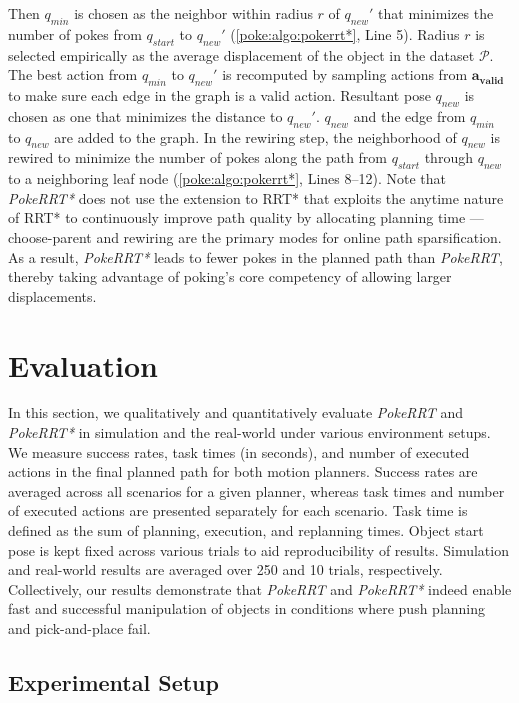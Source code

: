 Then $q_{min}$ is chosen as the neighbor within radius $r$ of $q_{new}'$ that minimizes the number of pokes from $q_{start}$ to $q_{new}'$ (\cref{poke:algo:pokerrt*}, Line 5). Radius $r$ is selected empirically as the average displacement of the object in the dataset $\mathcal{P}$.
The best action from $q_{min}$ to $q_{new}'$ is recomputed by sampling actions from $\boldsymbol{a_{valid}}$ to make sure each edge in the graph is a valid action. Resultant pose $q_{new}$ is chosen as one that minimizes the distance to $q_{new}'$. $q_{new}$ and the edge from $q_{min}$ to $q_{new}$ are added to the graph.
In the rewiring step, the neighborhood of $q_{new}$ is rewired to minimize the number of pokes along the path from $q_{start}$ through $q_{new}$ to a neighboring leaf node (\cref{poke:algo:pokerrt*}, Lines 8--12). Note that \textsl{PokeRRT*} does not use the extension to RRT* that exploits the anytime nature of RRT* to continuously improve path quality by allocating planning time \cite{karaman2011anytime}---choose-parent and rewiring are the primary modes for online path sparsification.
As a result, \textsl{PokeRRT*} leads to fewer pokes in the planned path than \textsl{PokeRRT}, thereby taking advantage of poking's core competency of allowing larger displacements.

\section{Evaluation}
\label{sec:poking:results}

In this section, we qualitatively and quantitatively evaluate \textsl{PokeRRT} and \textsl{PokeRRT*} in simulation and the real-world under various environment setups. We measure success rates, task times (in seconds), and number of executed actions in the final planned path for both motion planners. Success rates are averaged across all scenarios for a given planner, whereas task times and number of executed actions are presented separately for each scenario. Task time is defined as the sum of planning, execution, and replanning times. Object start pose is kept fixed across various trials to aid reproducibility of results. Simulation and real-world results are averaged over 250 and 10 trials, respectively.
Collectively, our results demonstrate that \textsl{PokeRRT} and \textsl{PokeRRT*} indeed enable fast and successful manipulation of objects in conditions where push planning and pick-and-place fail.

\subsection{Experimental Setup}

